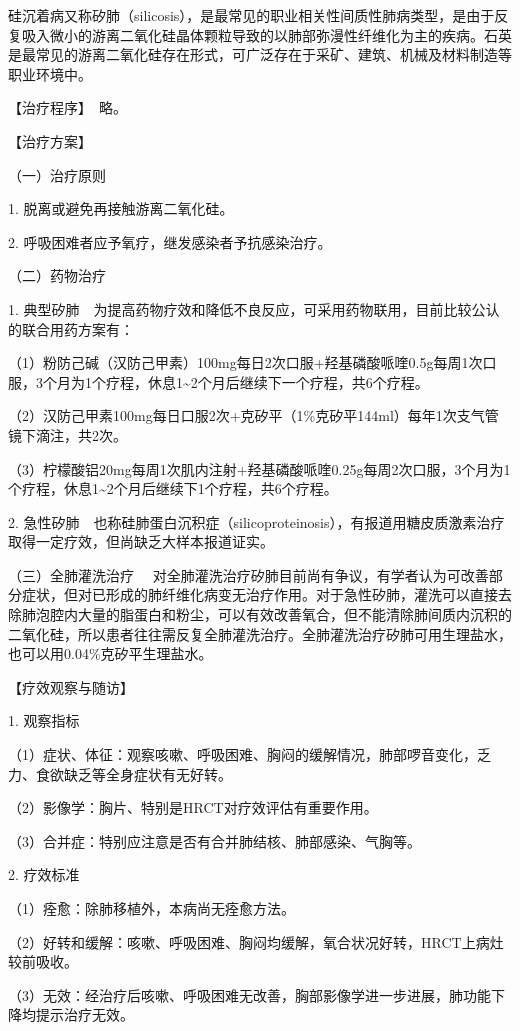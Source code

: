硅沉着病又称矽肺（silicosis），是最常见的职业相关性间质性肺病类型，是由于反复吸入微小的游离二氧化硅晶体颗粒导致的以肺部弥漫性纤维化为主的疾病。石英是最常见的游离二氧化硅存在形式，可广泛存在于采矿、建筑、机械及材料制造等职业环境中。

【治疗程序】　略。

【治疗方案】

{（一）治疗原则}

1. 脱离或避免再接触游离二氧化硅。

2. 呼吸困难者应予氧疗，继发感染者予抗感染治疗。

{（二）药物治疗}

1.
典型矽肺　为提高药物疗效和降低不良反应，可采用药物联用，目前比较公认的联合用药方案有：

（1）粉防己碱（汉防己甲素）100mg每日2次口服+羟基磷酸哌喹0.5g每周1次口服，3个月为1个疗程，休息1\textasciitilde{}2个月后继续下一个疗程，共6个疗程。

（2）汉防己甲素100mg每日口服2次+克矽平（1\%克矽平144ml）每年1次支气管镜下滴注，共2次。

（3）柠檬酸铝20mg每周1次肌内注射+羟基磷酸哌喹0.25g每周2次口服，3个月为1个疗程，休息1\textasciitilde{}2个月后继续下1个疗程，共6个疗程。

2.
急性矽肺　也称硅肺蛋白沉积症（silicoproteinosis），有报道用糖皮质激素治疗取得一定疗效，但尚缺乏大样本报道证实。

{（三）全肺灌洗治疗}
　对全肺灌洗治疗矽肺目前尚有争议，有学者认为可改善部分症状，但对已形成的肺纤维化病变无治疗作用。对于急性矽肺，灌洗可以直接去除肺泡腔内大量的脂蛋白和粉尘，可以有效改善氧合，但不能清除肺间质内沉积的二氧化硅，所以患者往往需反复全肺灌洗治疗。全肺灌洗治疗矽肺可用生理盐水，也可以用0.04\%克矽平生理盐水。

【疗效观察与随访】

1. 观察指标

（1）症状、体征：观察咳嗽、呼吸困难、胸闷的缓解情况，肺部啰音变化，乏力、食欲缺乏等全身症状有无好转。

（2）影像学：胸片、特别是HRCT对疗效评估有重要作用。

（3）合并症：特别应注意是否有合并肺结核、肺部感染、气胸等。

2. 疗效标准

（1）痊愈：除肺移植外，本病尚无痊愈方法。

（2）好转和缓解：咳嗽、呼吸困难、胸闷均缓解，氧合状况好转，HRCT上病灶较前吸收。

（3）无效：经治疗后咳嗽、呼吸困难无改善，胸部影像学进一步进展，肺功能下降均提示治疗无效。

